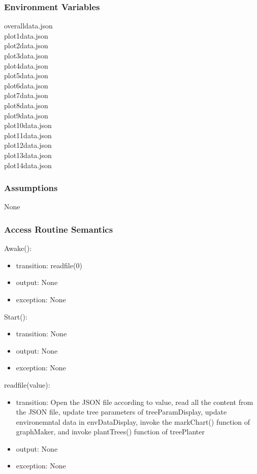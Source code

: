 \documentclass[12pt, titlepage]{article}
\begin{document}
\subsubsection{Environment Variables}
overalldata.json\\
plot1data.json\\
plot2data.json\\
plot3data.json\\
plot4data.json\\
plot5data.json\\
plot6data.json\\
plot7data.json\\
plot8data.json\\
plot9data.json\\
plot10data.json\\
plot11data.json\\
plot12data.json\\
plot13data.json\\
plot14data.json

\subsubsection{Assumptions}
None

\subsubsection{Access Routine Semantics}
Awake():
\begin{itemize}
    \item transition: readfile(0)
    \item output: None
    \item exception: None
\end{itemize}
Start():
\begin{itemize}
    \item transition: None
    \item output: None
    \item exception: None
\end{itemize}
readfile(value):
\begin{itemize}
    \item transition: Open the JSON file according to value, read all the content from the JSON file, update tree parameters of treeParamDisplay, update environemntal data in envDataDisplay, invoke the markChart() function of graphMaker, and invoke plantTrees() function of treePlanter 
    \item output: None
    \item exception: None
\end{itemize}
\end{document}
